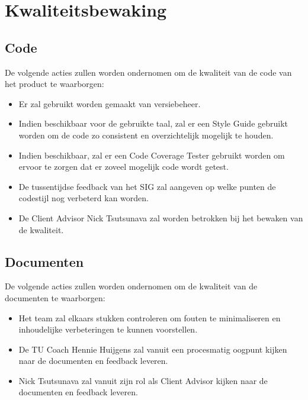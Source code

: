 \section{Kwaliteitsbewaking}
\subsection{Code}
De volgende acties zullen worden ondernomen om de kwaliteit van de code van het product te waarborgen:

\begin{itemize}
	\item Er zal gebruikt worden gemaakt van versiebeheer. 
	\item Indien beschikbaar voor de gebruikte taal, zal er een Style Guide gebruikt worden om de code zo consistent en overzichtelijk mogelijk te houden.
	\item Indien beschikbaar, zal er een Code Coverage Tester gebruikt worden om ervoor te zorgen dat er zoveel mogelijk code wordt getest. 
	\item De tussentijdse feedback van het SIG zal aangeven op welke punten de codestijl nog verbeterd kan worden.
	\item De Client Advisor Nick Tsutsunava zal worden betrokken bij het bewaken van de kwaliteit.
\end{itemize}

\subsection{Documenten}
De volgende acties zullen worden ondernomen om de kwaliteit van de documenten te waarborgen:
\begin{itemize}
	\item Het team zal elkaars stukken controleren om fouten te minimaliseren en inhoudelijke verbeteringen te kunnen voorstellen.
	\item De TU Coach Hennie Huijgens zal vanuit een procesmatig oogpunt kijken naar de documenten en feedback leveren.
	\item Nick Tsutsunava zal vanuit zijn rol als Client Advisor kijken naar de documenten en feedback leveren.
\end{itemize}

